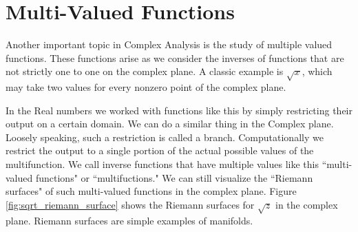 \section*{Multi-Valued Functions}

Another important topic in Complex Analysis is the study of multiple valued functions.
These functions arise as we consider the inverses of functions that are not strictly one to one on the complex plane.
A classic example is $\sqrt{x}$, which may take two values for every nonzero point of the complex plane.

In the Real numbers we worked with functions like this by simply restricting their output on a certain domain.
We can do a similar thing in the Complex plane.
Loosely speaking, such a restriction is called a branch.
Computationally we restrict the output to a single portion of the actual possible values of the multifunction.
We call inverse functions that have multiple values like this ``multi-valued functions" or ``multifuctions."
We can still visualize the ``Riemann surfaces" of such multi-valued functions in the complex plane.
Figure \ref{fig:sqrt_riemann_surface} shows the Riemann surfaces for $\sqrt{z}$ in the complex plane.
Riemann surfaces are simple examples of manifolds.

